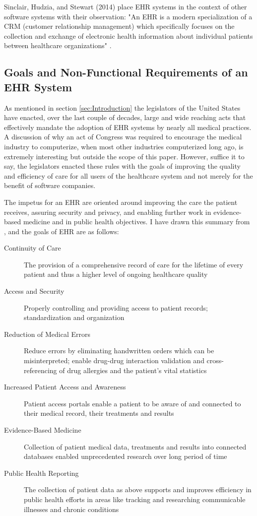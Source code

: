 \documentclass[10pt]{article}
\begin{document}
Sinclair, Hudzia, and Stewart (2014) place EHR systems in the context of other software systems with their observation: "An EHR is a modern specialization of a CRM (customer relationship management) which specifically focuses on the collection and exchange of electronic health information about individual patients between healthcare organizations" \cite{auditingprivacy}.


\subsection{Goals and Non-Functional Requirements of an EHR System}
\label{sec:Goals of an EHR}

As mentioned in section \ref{sec:Introduction} the legislators of the United States have enacted, over the last couple of decades, large and wide reaching acts that effectively mandate the adoption of EHR systems by nearly all medical practices.
A discussion of why an act of Congress was required to encourage the medical industry to computerize, when most other industries computerized long ago, is extremely interesting but outside the scope of this paper.
However, suffice it to say, the legislators enacted these rules with the goals of improving the quality and efficiency of care for all users of the healthcare system and not merely for the benefit of software companies.

The impetus for an EHR are oriented around improving the care the patient receives, assuring security and privacy, and enabling further work in evidence-based medicine and in public health objectives.
I have drawn this summary from \cite{ehrbook}, and the goals of EHR are as follows:
\begin{description}
	\item[Continuity of Care] The provision of a comprehensive record of care for the lifetime of every patient and thus a higher level of ongoing healthcare quality
	\item[Access and Security] Properly controlling and providing access to patient records; standardization and organization
	\item[Reduction of Medical Errors] Reduce errors by eliminating handwritten orders which can be misinterpreted; enable drug-drug interaction validation and cross-referencing of drug allergies and the patient's vital statistics
	\item[Increased Patient Access and Awareness] Patient access portals enable a patient to be aware of and connected to their medical record, their treatments and results
	\item[Evidence-Based Medicine] Collection of patient medical data, treatments and results into connected databases enabled unprecedented research over long period of time
	\item[Public Health Reporting] The collection of patient data as above supports and improves efficiency in public health efforts in areas like tracking and researching communicable illnesses and chronic conditions
\end{description}
\end{document}
